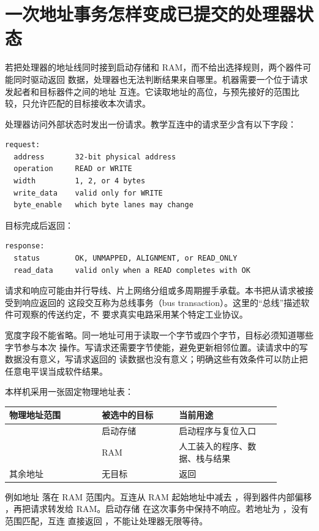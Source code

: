 \section{一次地址事务怎样变成已提交的处理器状态}

若把处理器的地址线同时接到启动存储和 RAM，而不给出选择规则，两个器件可能同时驱动返回
数据，处理器也无法判断结果来自哪里。机器需要一个位于请求发起者和目标器件之间的地址
互连。它读取地址的高位，与预先接好的范围比较，只允许匹配的目标接收本次请求。


处理器访问外部状态时发出一份请求。教学互连中的请求至少含有以下字段：

\begin{lstlisting}
request:
  address       32-bit physical address
  operation     READ or WRITE
  width         1, 2, or 4 bytes
  write_data    valid only for WRITE
  byte_enable   which byte lanes may change
\end{lstlisting}

目标完成后返回：

\begin{lstlisting}
response:
  status        OK, UNMAPPED, ALIGNMENT, or READ_ONLY
  read_data     valid only when a READ completes with OK
\end{lstlisting}

请求和响应可能由并行导线、片上网络分组或多周期握手承载。本书把从请求被接受到响应返回的
这段交互称为总线事务（bus transaction）。这里的“总线”描述软件可观察的传送约定，不
要求真实电路采用某个特定工业协议。

宽度字段不能省略。同一地址可用于读取一个字节或四个字节，目标必须知道哪些字节参与本次
操作。写请求还需要字节使能，避免更新相邻位置。读请求中的写数据没有意义，写请求返回的
读数据也没有意义；明确这些有效条件可以防止把任意电平误当成软件结果。


本样机采用一张固定物理地址表：

\begin{longtable}{|L{0.30\linewidth}|L{0.25\linewidth}|L{0.33\linewidth}|}
\hline
{}
物理地址范围 & 被选中的目标 & 当前用途 \\ \hline
{} & 启动存储 & 启动程序与复位入口 \\ \hline
{} & RAM & 人工装入的程序、数据、栈与结果 \\ \hline
其余地址 & 无目标 & 返回  \\ \hline
\end{longtable}

例如地址  落在 RAM 范围内。互连从 RAM 起始地址中减去
，得到器件内部偏移 ，再把请求转发给 RAM。启动存储
在这次事务中保持不响应。若地址为 ，没有范围匹配，互连
直接返回 ，不能让处理器无限等待。

